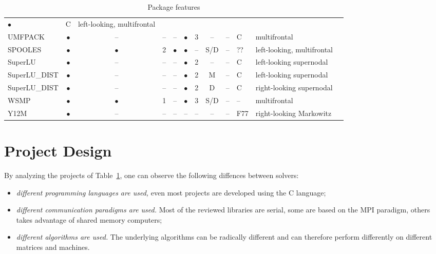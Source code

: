 \documentclass[acmtocl]{acmtrans2m}
\begin{document}
\begin{table}
\begin{center}
\begin{tabular}{| l | c c c c | c c c c l l | p{5cm} |}
$\bullet$ & C & left-looking, multifrontal &
\cite{irony04parallel,rotkin04design,rozin04locality} \\
%
UMFPACK     & $\bullet$ & --        & -- & --        & $\bullet$ & 3 & -- & --
& C & multifrontal & \cite{umfpack-home-page} \\
%
SPOOLES     & $\bullet$ & $\bullet$ & 2 & $\bullet$ & $\bullet$ & -- & S/D &
-- & ?? & left-looking, multifrontal & \cite{spooles} \\
%  
SuperLU     & $\bullet$ & --        & -- & --        & $\bullet$ & 2 & -- & --
& C & left-looking supernodal &  \cite{superlu-manual} \\
%
SuperLU\_DIST & $\bullet$ & --        & -- & --        & $\bullet$ & 2 & M & -- & C & left-looking supernodal &  \cite{superlu-manual} \\
SuperLU\_DIST & $\bullet$ & --        & -- & --        & $\bullet$ & 2 & D & -- & C & right-looking supernodal & \cite{superlu-manual} \\
WSMP & $\bullet$ & $\bullet$ & 1 & -- & $\bullet$ & 3 & S/D & -- & -- &
multifrontal & \cite{wsmp} \\
Y12M & $\bullet$ & -- & -- & -- & -- & -- & -- & -- & F77 & right-looking Markowitz & \cite{y12m} \\


\hline
\end{tabular}
\caption{Package features}
\label{tab:packages}
\end{center}
\end{table}


\section{Project Design}
\label{sec:design}

By analyzing the projects of Table~\ref{tab:packages}, one can observe the following diffences between solvers: 
\begin{itemize}
\item {\sl different programming languages are used,} even most projects are
developed using the C language;

\item {\sl different communication paradigms are used.} 
 Most of the reviewed libraries are serial, some are based on the MPI
 paradigm, others takes advantage of shared memory computers;

\item {\sl different algorithms are used.} The underlying algorithms can be radically
different and can therefore perform differently on different matrices and
machines.

\end{itemize}
\end{document}
